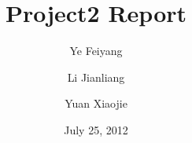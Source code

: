 \documentclass[11pt,oneside,a4paper]{report}
\begin{document}
\title{Project2 Report}
\author{Ye Feiyang \and Li Jianliang \and Yuan Xiaojie}
\date{July 25, 2012}
\maketitle

\section*{}

\section*{}

\section*{}
\end{document}
